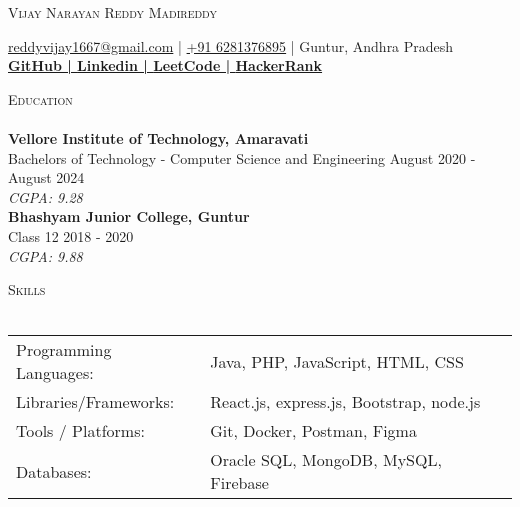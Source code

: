 \documentclass[a4paper]{article}
\newcommand{\lineunder} {
    \vspace*{-8pt} \\
    \hspace*{-18pt} \hrulefill \\
}
\newcommand{\header} [1] {
    {\hspace*{-18pt}\vspace*{6pt} \textsc{#1}}
    \vspace*{-6pt} \lineunder
}
\begin{document}
    \vspace*{-40pt}

    

%
%
  \vspace*{-2pt}
  \begin{center}
    {\Huge \scshape {Vijay Narayan Reddy Madireddy}}\\
    \vspace*{2pt}
    
    \vspace*{2pt}
    \href{mailto:reddyvijay1667@gmail.com}{reddyvijay1667@gmail.com} | \href{tel:+91 6281376895}{+91 6281376895} | Guntur, Andhra Pradesh\\
    \vspace*{2pt}
    \textbf{\href{https://github.com/Vijay1667}{GitHub | }}\textbf{\href{https://www.linkedin.com/in/vijay-reddy-160mv/}{Linkedin | }}\textbf{\href{https://leetcode.com/reddyvijay1667/}{LeetCode | }}\textbf{\href{https://www.hackerrank.com/reddyvijay1667?hr\_r=1}{HackerRank}}\\
  \end{center}



      \header{Education}
      \vspace{2mm}
      \textbf{Vellore Institute of Technology, Amaravati}\\
Bachelors of Technology - Computer Science and Engineering \hfill August 2020 - August 2024\\
{\sl CGPA: 9.28}\\
\vspace{2mm}
\textbf{Bhashyam Junior College, Guntur}\\
Class 12 \hfill 2018 - 2020\\
{\sl CGPA: 9.88}\\
\vspace{2mm}


%
%
  \header{Skills}
  \vspace{2mm}
  \begin{longtable}{p{4cm}p{12cm}}
  Programming Languages: & Java, PHP, JavaScript, HTML, CSS \\
  Libraries/Frameworks: & React.js, express.js, Bootstrap, node.js \\
  Tools / Platforms: & Git, Docker, Postman, Figma  \\
  Databases: & Oracle SQL, MongoDB, MySQL, Firebase \\
  \end{longtable}
  \vspace{1mm}
\end{document}
